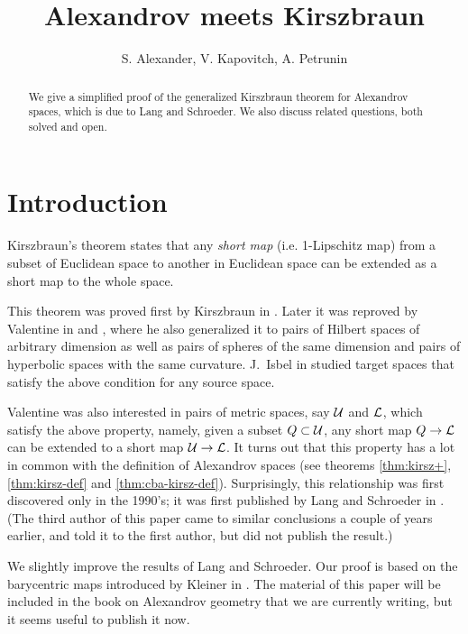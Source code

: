 \documentclass[oneside,a4paper]{article}
\begin{document}
\title{Alexandrov meets Kirszbraun}
\author{S. Alexander, V. Kapovitch, A. Petrunin}
\date{}
\maketitle

\begin{abstract}
We give a simplified proof of the generalized Kirszbraun theorem for Alexandrov spaces,
which is due to Lang and Schroeder.
We also discuss related questions, both solved and open. 
\end{abstract}

\section{Introduction}

Kirszbraun's theorem states that any \emph{short map} (i.e. 1-Lipschitz map) from a subset of Euclidean space to another in Euclidean space can be extended as a short map to the whole space.

This theorem was proved first by Kirszbraun in \cite{kirszbraun}.  Later it was reproved by Valentine in \cite{valentine-sphere} and \cite{valentine-kirszbraun}, where he also generalized it to pairs of Hilbert spaces of arbitrary dimension 
as well as pairs of spheres of the same dimension 
and pairs of hyperbolic spaces with the same curvature.
J.~Isbel in \cite{isbell} studied target spaces that satisfy the above condition for any source space.

Valentine was also interested in pairs of metric spaces,
say $\mathcal{U}$ and $\mathcal{L}$,
which satisfy the above property, namely, given a subset $Q\subset\spc{U}$, 
any short map $Q\to\spc{L}$ 
can be extended to a short map $\spc{U}\to \spc{L}$.
It turns out that this property has a lot in common with the definition of Alexandrov spaces
(see theorems \ref{thm:kirsz+}, \ref{thm:kirsz-def} and \ref{thm:cba-kirsz-def}).
Surprisingly, this relationship was first discovered only in the 1990's;
it was first published by Lang and Schroeder in \cite{lang-schroeder}.
(The third author of this paper came to similar conclusions a couple of years earlier, and told it to the first author, but did not publish the result.)%

We slightly improve the results of Lang and Schroeder.
Our proof is based on the barycentric maps introduced by Kleiner in \cite{kleiner}.
The material of this paper will be included in the book on Alexandrov geometry that we are currently writing, but it seems useful to publish it now.
\end{document}
